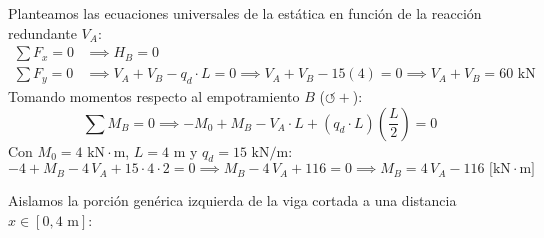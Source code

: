 Planteamos las ecuaciones universales de la estática en función de la reacción redundante $V_A$:
\begin{align}
    \sum F_x = 0 & \implies \boxed{H_B = 0} \\[6pt]
    \sum F_y = 0 & \implies V_A + V_B - q_d \cdot L = 0 \implies V_A + V_B - 15(4) = 0 \implies \boxed{V_A + V_B = 60\text{ kN}}
\end{align}
Tomando momentos respecto al empotramiento $B$ ($\circlearrowleft +$):
\begin{equation}
    \sum M_B = 0 \implies -M_0 + M_B - V_A \cdot L + (q_d \cdot L)\left(\frac{L}{2}\right) = 0
\end{equation}
Con $M_0 = 4\text{ kN}\cdot\text{m}$, $L = 4\text{ m}$ y $q_d = 15\text{ kN/m}$:
\begin{equation}
    -4 + M_B - 4\,V_A + 15 \cdot 4 \cdot 2 = 0 \implies M_B - 4\,V_A + 116 = 0 \implies \boxed{M_B = 4\,V_A - 116\text{ [kN}\cdot\text{m]}}
\end{equation}



Aislamos la porción genérica izquierda de la viga cortada a una distancia $x \in [0, 4\text{ m}]$:

